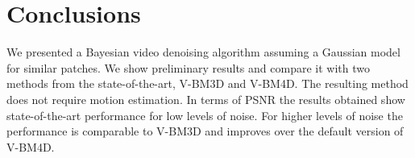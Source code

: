 \documentclass{llncs}
\begin{document}
\section{Conclusions}
\label{sec:conclusion}

We presented a Bayesian video denoising algorithm assuming a Gaussian model for similar patches. 
We show preliminary results and compare it with two methods from the
state-of-the-art, V-BM3D and V-BM4D.
The resulting method does not require motion estimation.%
In terms of PSNR
the results obtained show state-of-the-art performance for low levels of noise.
For higher levels of noise the performance is comparable to V-BM3D and improves
over the default version of V-BM4D.


%
%



\end{document}
